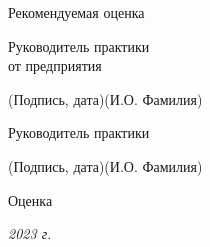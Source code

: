 \documentclass[14pt, russian]{scrartcl}
\begin{document}
\begin{titlepage}
\bigskip

\noindent Рекомендуемая оценка\hfill\underline{\hspace{195pt}}\hfill

\bigskip

\noindent \parbox{0.333\textwidth}{Руководитель практики\\от предприятия}  
\hfill \underline{\hspace{4cm}}\quad \underline{\hspace{4cm}}

\vspace{-2ex}
\noindent\hspace{13.5ex}\normalsize\hspace{170pt}\hspace{2ex}\scriptsize{(Подпись, дата)}\normalsize\hspace{30pt}\hspace{6ex}\scriptsize{(И.О. Фамилия)}\normalsize


\bigskip

\noindent Руководитель практики  \hfill \underline{\hspace{4cm}}\quad
\underline{\hspace{4cm}}

\vspace{-2ex}
\noindent\hspace{13.5ex}\normalsize\hspace{170pt}\hspace{2ex}\scriptsize{(Подпись, дата)}\normalsize\hspace{30pt}\hspace{6ex}\scriptsize{(И.О. Фамилия)}\normalsize

\vspace{2ex}
\noindent Оценка\hfill\underline{\hspace{195pt}}

\vfill

 


\begin{center}
\textsl{2023 г.}
\end{center}
\end{titlepage}


\setlength{\tabcolsep}{3pt}
\newpage
\setcounter{page}{2}
\end{document}
